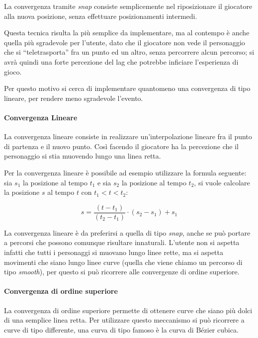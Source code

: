 \documentclass[a4paper,11pt]{article}
\begin{document}
La convergenza tramite \emph{snap} consiste semplicemente nel riposizionare il giocatore alla nuova posizione, senza effettuare posizionamenti intermedi.

Questa tecnica risulta la pi\`u semplice da implementare, ma al contempo \`e anche quella pi\`u sgradevole per l'utente, dato che il giocatore non vede il personaggio che si ``teletrasporta'' fra un punto ed un altro, senza percorrere alcun percorso; si avr\`a quindi una forte percezione del lag che potrebbe inficiare l'esperienza di gioco.

Per questo motivo si cerca di implementare quantomeno una convergenza di tipo lineare, per rendere meno sgradevole l'evento.

\paragraph{Convergenza Lineare}

La convergenza lineare consiste in realizzare un'interpolazione lineare fra il punto di partenza e il nuovo punto. Cos\`i facendo il giocatore ha la percezione che il personaggio si stia muovendo lungo una linea retta.

Per la convergenza lineare \`e possibile ad esempio utilizzare la formula seguente: sia $s_1$ la posizione al tempo $t_1$ e sia $s_2$ la posizione al tempo $t_2$, si vuole calcolare la posizione $s$ al tempo $t$ con $t_1 < t < t_2$:

$$ s = \frac{(t - t_1)}{(t_2 - t_1)} \cdot (s_2 - s_1) + s_1 $$

La convergenza lineare \`e da preferirsi a quella di tipo \emph{snap}, anche se pu\`o portare a percorsi che possono comunque risultare innaturali. L'utente non si aspetta infatti che tutti i personaggi si muovano lungo linee rette, ma si aspetta movimenti che siano lungo linee curve (quella che viene chiamo un percorso di tipo \emph{smooth}), per questo si pu\`o ricorrere alle convergenze di ordine superiore.

\paragraph{Convergenza di ordine superiore}

La convergenza di ordine superiore permette di ottenere curve che siano pi\`u dolci di una semplice linea retta. Per utilizzare questo meccanismo si pu\`o ricorrere a curve di tipo differente, una curva di tipo famoso \`e la curva di B\'ezier cubica.
\end{document}
